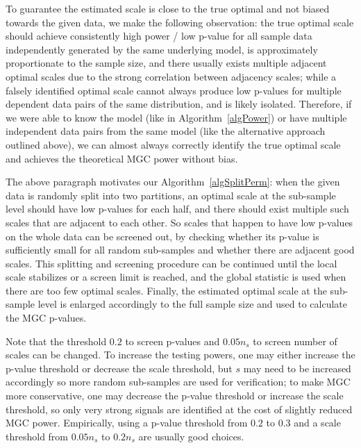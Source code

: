 \documentclass[11pt]{article}
\begin{document}
To guarantee the estimated scale is close to the true optimal and not biased towards the given data, we make the following observation: the true optimal scale should achieve consistently high power / low p-value for all sample data independently generated by the same underlying model, is approximately proportionate to the sample size, and there usually exists multiple adjacent optimal scales due to the strong correlation between adjacency scales; while a falsely identified optimal scale cannot always produce low p-values for multiple dependent data pairs of the same distribution, and is likely isolated. Therefore, if we were able to know the model (like in Algorithm~\ref{algPower}) or have multiple independent data pairs from the same model (like the alternative approach outlined above), we can almost always correctly identify the true optimal scale and achieves the theoretical MGC power without bias.

The above paragraph motivates our Algorithm~\ref{algSplitPerm}: when the given data is randomly split into two partitions, an optimal scale at the sub-sample level should have low p-values for each half, and there should exist multiple such scales that are adjacent to each other. So scales that happen to have low p-values on the whole data can be screened out, by checking whether its p-value is sufficiently small for all random sub-samples and whether there are adjacent good scales. This splitting and screening procedure can be continued until the local scale stabilizes or a screen limit is reached, and the global statistic is used when there are too few optimal scales. Finally, the estimated optimal scale at the sub-sample level is enlarged accordingly to the full sample size and used to calculate the MGC p-values. 

Note that the threshold $0.2$ to screen p-values and $0.05 n_{s}$ to screen number of scales can be changed. To increase the testing powers, one may either increase the p-value threshold or decrease the scale threshold, but $s$ may need to be increased accordingly so more random sub-samples are used for verification; to make MGC more conservative, one may decrease the p-value threshold or increase the scale threshold, so only very strong signals are identified at the cost of slightly reduced MGC power. Empirically, using a p-value threshold from $0.2$ to $0.3$ and a scale threshold from $0.05n_{s}$ to $0.2n_{s}$ are usually good choices.
\end{document}
